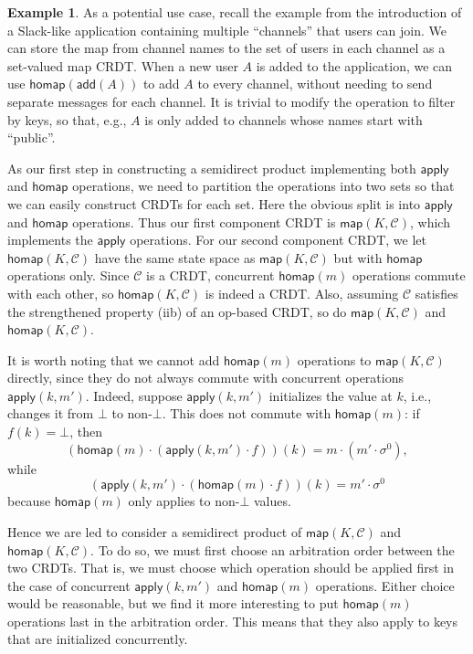 \documentclass[acmsmall,nonacm,12pt]{acmart}
\newcommand{\mc}[1]{\ensuremath{\mathcal{#1}}}
\newcommand{\msf}[1]{\ensuremath{\mathsf{#1}}}
\theoremstyle{plain}
\theoremstyle{definition}
\newtheorem{myex}[mythm]{Example}
\begin{document}
\begin{myex}
As a potential use case, recall the example from the introduction of a Slack-like application containing multiple ``channels'' that users can join.  We can store the map from channel names to the set of users in each channel as a set-valued map CRDT.  When a new user $A$ is added to the application, we can use $\msf{homap}(\msf{add}(A))$ to add $A$ to every channel, without needing to send separate messages for each channel.  It is trivial to modify the operation to filter by keys, so that, e.g., $A$ is only added to channels whose names start with ``public''.
\end{myex}

As our first step in constructing a semidirect product implementing both $\msf{apply}$ and $\msf{homap}$ operations, we need to partition the operations into two sets so that we can easily construct CRDTs for each set.  Here the obvious split is into $\msf{apply}$ and $\msf{homap}$ operations.  Thus our first component CRDT is $\msf{map}(K, \mc{C})$, which implements the $\msf{apply}$ operations.  For our second component CRDT, we let $\msf{homap}(K, \mc{C})$ have the same state space as $\msf{map}(K, \mc{C})$ but with $\msf{homap}$ operations only.  Since $\mc{C}$ is a CRDT, concurrent $\msf{homap}(m)$ operations commute with each other, so $\msf{homap}(K, \mc{C})$ is indeed a CRDT.  Also, assuming $\mc{C}$ satisfies the strengthened property (iib) of an op-based CRDT, so do $\msf{map}(K, \mc{C})$ and $\msf{homap}(K, \mc{C})$.

It is worth noting that we cannot add $\msf{homap}(m)$ operations to $\msf{map}(K, \mc{C})$ directly, since they do not always commute with concurrent operations $\msf{apply}(k, m')$.  Indeed, suppose $\msf{apply}(k, m')$ initializes the value at $k$, i.e., changes it from $\bot$ to non-$\bot$.  This does not commute with $\msf{homap}(m)$: if $f(k) = \bot$, then
\[
\left(\msf{homap}(m) \cdot (\msf{apply}(k, m') \cdot f)\right)(k) = m \cdot (m' \cdot \sigma^0),
\]
while
\[
\left(\msf{apply}(k, m') \cdot (\msf{homap}(m) \cdot f)\right)(k) = m' \cdot \sigma^0
\]
because $\msf{homap}(m)$ only applies to non-$\bot$ values.

Hence we are led to consider a semidirect product of $\msf{map}(K, \mc{C})$ and $\msf{homap}(K, \mc{C})$.  To do so, we must first choose an arbitration order between the two CRDTs.  That is, we must choose which operation should be applied first in the case of concurrent $\msf{apply}(k, m')$ and $\msf{homap}(m)$ operations.  Either choice would be reasonable, but we find it more interesting to put $\msf{homap}(m)$ operations last in the arbitration order.  This means that they also apply to keys that are initialized concurrently.  %
\end{document}
